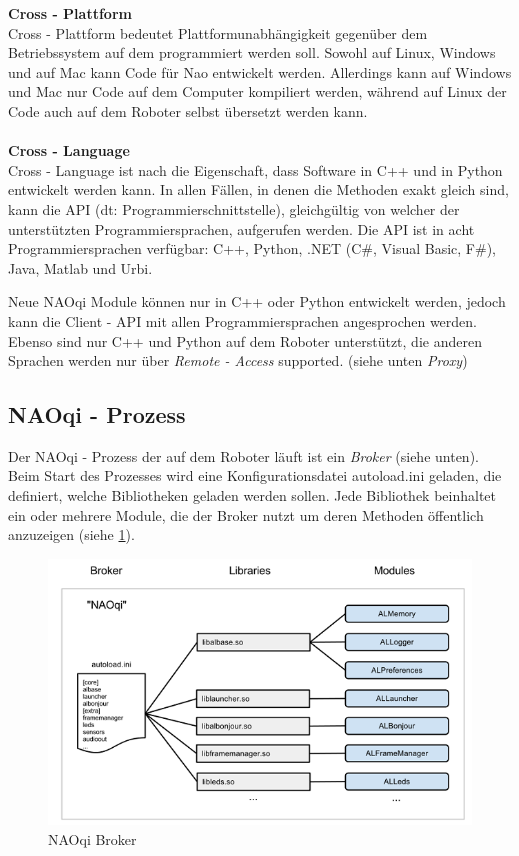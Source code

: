 \textbf{Cross - Plattform}
\\
Cross - Plattform bedeutet Plattformunabhängigkeit gegenüber dem Betriebssystem auf dem programmiert werden soll. Sowohl auf Linux, Windows und auf Mac kann Code für Nao entwickelt werden. Allerdings kann auf Windows und Mac nur Code auf dem Computer kompiliert werden, während auf Linux der Code auch auf dem Roboter selbst übersetzt werden kann.
\\
\\
\textbf{Cross - Language}
\\	
Cross - Language ist nach \cite{ws:naodocu} die Eigenschaft, dass Software in C++ und in Python entwickelt werden kann. In allen Fällen, in denen die Methoden exakt gleich sind, kann die \ac{API} (dt: Programmierschnittstelle), gleichgültig von welcher der unterstützten Programmiersprachen, aufgerufen werden. Die \ac{API} ist in acht Programmiersprachen verfügbar: C++, Python, .NET (C\#, Visual Basic, F\#), Java, Matlab und Urbi.

Neue NAOqi Module können nur in C++ oder Python entwickelt werden, jedoch kann die Client - API mit allen Programmiersprachen angesprochen werden. Ebenso sind nur C++ und Python auf dem Roboter unterstützt, die anderen Sprachen werden nur über \textit{Remote - Access} supported. (siehe unten \textit{Proxy})
\\
\subsection{NAOqi - Prozess}
Der NAOqi - Prozess der auf dem Roboter läuft ist ein \textit{Broker} (siehe unten). Beim Start des Prozesses wird eine Konfigurationsdatei \textsf{autoload.ini} geladen, die definiert, welche Bibliotheken geladen werden sollen. Jede Bibliothek beinhaltet ein oder mehrere Module, die der Broker nutzt um deren Methoden öffentlich anzuzeigen (siehe \ref{f:naoqi_broker1}).

\begin{figure}[H]						
	\centering							
	\includegraphics[scale=0.8]{Bilder/naoqi_process1.PNG}
	\caption{NAOqi Broker}						
	\label{f:naoqi_broker1}						
\end{figure}

